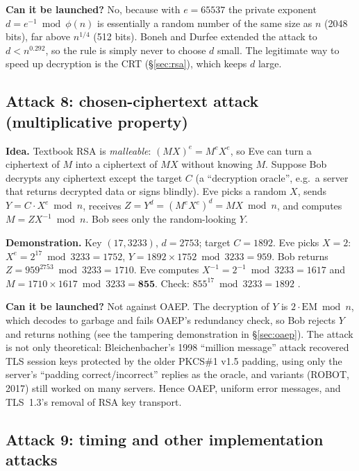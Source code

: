 \textbf{Can it be launched?} No, because with $e = 65537$ the private exponent $d = e^{-1} \bmod \phi(n)$ is essentially a random number of the same size as $n$ (2048 bits), far above $n^{1/4}$ (512 bits). Boneh and Durfee extended the attack to $d < n^{0.292}$, so the rule is simply never to choose $d$ small. The legitimate way to speed up decryption is the CRT (\S\ref{sec:rsa}), which keeps $d$ large.

\subsection{Attack 8: chosen-ciphertext attack (multiplicative property) \new}

\textbf{Idea.} Textbook RSA is \emph{malleable}: $(M X)^e = M^e X^e$, so Eve can turn a ciphertext of $M$ into a ciphertext of $MX$ without knowing $M$. Suppose Bob decrypts any ciphertext except the target $C$ (a ``decryption oracle'', e.g.\ a server that returns decrypted data or signs blindly). Eve picks a random $X$, sends $Y = C \cdot X^e \bmod n$, receives $Z = Y^d = (M^e X^e)^d = M X \bmod n$, and computes $M = Z X^{-1} \bmod n$. Bob sees only the random-looking $Y$.

\textbf{Demonstration.} Key $(17, 3233)$, $d = 2753$; target $C = 1892$. Eve picks $X = 2$: $X^e = 2^{17} \bmod 3233 = 1752$, $Y = 1892 \times 1752 \bmod 3233 = 959$. Bob returns $Z = 959^{2753} \bmod 3233 = 1710$. Eve computes $X^{-1} = 2^{-1} \bmod 3233 = 1617$ and $M = 1710 \times 1617 \bmod 3233 = \mathbf{855}$. Check: $855^{17} \bmod 3233 = 1892$ \checkmark.

\textbf{Can it be launched?} Not against OAEP. The decryption of $Y$ is $2 \cdot \text{EM} \bmod n$, which decodes to garbage and fails OAEP's redundancy check, so Bob rejects $Y$ and returns nothing (see the tampering demonstration in \S\ref{sec:oaep}). The attack is not only theoretical: Bleichenbacher's 1998 ``million message'' attack recovered TLS session keys protected by the older PKCS\#1 v1.5 padding, using only the server's ``padding correct/incorrect'' replies as the oracle, and variants (ROBOT, 2017) still worked on many servers. Hence OAEP, uniform error messages, and TLS~1.3's removal of RSA key transport.

\subsection{Attack 9: timing and other implementation attacks \new}

